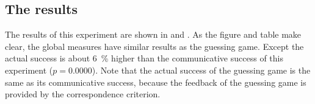 \subsection{The results}

The results of this experiment are shown in  and . As the figure and table make clear, the global measures have similar results as the guessing game. Except the actual success is about 6~\% higher than the communicative success of this experiment ($p=0.0000$). Note that the actual success of the guessing game is the same as its communicative success, because the feedback of the guessing game is provided by the correspondence criterion.

\begin{figure}
\centering
{}

\end{figure}
